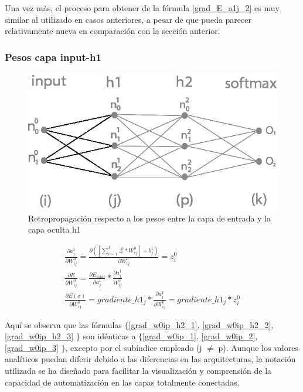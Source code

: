 Una vez más, el proceso para obtener de la fórmula \ref{grad_E_a1j_2} es muy similar al utilizado en casos anteriores, a pesar de que pueda parecer relativamente nueva en comparación con la sección anterior. \\


\subsubsection{Pesos capa input-h1}

\begin{figure}[H]
	\centering
	\includegraphics[scale=0.35]{imagenes/nn_2_capa_pesos_input_h1.jpg}  
	\caption{Retropropagación respecto a los pesos entre la capa de entrada y la capa oculta h1}
	\label{fig:nn_2_pesos_input_h1}
\end{figure}


\begin{gather}
	\frac{\partial a^1_j }{\partial W^0_{ij} } = \frac{\partial ([\sum_{c=1}^{I} z^0_c * W^0_{cj}] + b^1_j)}{\partial W^0_{ij} } = z^0_i \label{grad_w0ip_h2_1} \\
	\frac{\partial E}{\partial W^0_{ij}} = \frac{\partial E_{total} }{\partial a^1_j } * \frac{\partial a^1_j}{W^0_{ij}} \label{grad_w0ip_h2_2} \\
	\frac{\partial E(x) }{\partial W^0_{ij} } = gradiente\_h1_j * \frac{\partial a^1_j }{\partial W^0_{ij} } = gradiente\_h1_j * z^0_i \label{grad_w0ip_h2_3}
\end{gather}

Aquí se observa que las fórmulas $\{$\ref{grad_w0ip_h2_1}, \ref{grad_w0ip_h2_2}, \ref{grad_w0ip_h2_3} $\}$ son idénticas a $\{$\ref{grad_w0ip_1}, \ref{grad_w0ip_2}, \ref{grad_w0ip_3} $\}$, excepto por el subíndice empleado (j $\neq$ p). Aunque los valores analíticos puedan diferir debido a las diferencias en las arquitecturas, la notación utilizada se ha diseñado para facilitar la visualización y comprensión de la capacidad de automatización en las capas totalmente conectadas.

